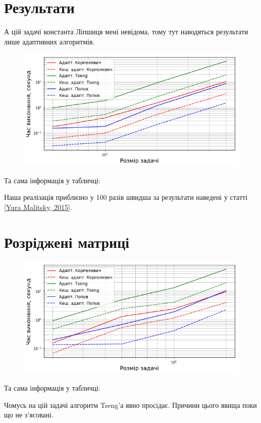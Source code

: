 \section{Результати}

А цій задачі константа Ліпшиця мені невідома, тому тут наводяться результати лише адаптивних алгоритмів.

\begin{figure}[H]
    \centering
    \includegraphics[width=.75\textwidth]{img/4/adapt/time.png}
\end{figure}

Та сама інформація у табличці:



\begin{remark}
    Наша реалізація приблизно у 100 разів швидша за результати наведені у статті \href{https://arxiv.org/abs/1502.04968v1}{[Yura Malitsky, 2015]}. 
\end{remark}



\section{Розріджені матриці}

\begin{figure}[H]
    \centering
    \includegraphics[width=.75\textwidth]{img/4/sparse/adapt/time.png}
\end{figure}

Та сама інформація у табличці:





\begin{remark}
    Чомусь на цій задачі алгоритм Tseng'а явно просідає. Причини цього явища поки що не з'ясовані.
\end{remark}
